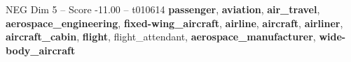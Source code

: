 \begin{textsample}{NEG Dim 5 – Score -11.00 – t010614}  \label{ex:f5_neg_040}
\textbf{passenger}, \textbf{aviation}, \textbf{air\_travel}, \textbf{aerospace\_engineering}, \textbf{fixed-wing\_aircraft}, \textbf{airline}, \textbf{aircraft}, \textbf{airliner}, \textbf{aircraft\_cabin}, \textbf{flight}, flight\_attendant, \textbf{aerospace\_manufacturer}, \textbf{wide-body\_aircraft}

\end{textsample}
